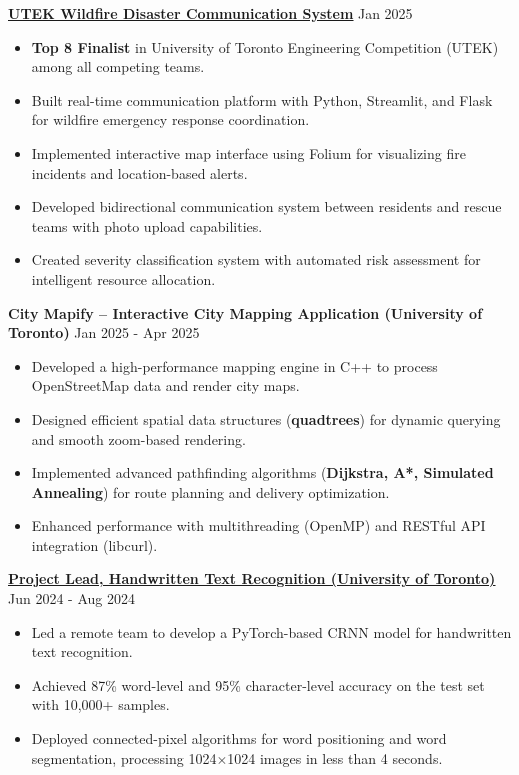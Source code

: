 \documentclass[letterpaper,10pt]{article}
\begin{document}
\noindent\href{https://github.com/Ken-2511/utek_disaster_communication_system}{\uline{
\textbf{UTEK Wildfire Disaster Communication System}}} \hfill Jan 2025
\begin{itemize}[leftmargin=0.2in]
    \item \textbf{Top 8 Finalist} in University of Toronto Engineering Competition (UTEK) among all competing teams.
    \item Built real-time communication platform with Python, Streamlit, and Flask for wildfire emergency response coordination.
    \item Implemented interactive map interface using Folium for visualizing fire incidents and location-based alerts.
    \item Developed bidirectional communication system between residents and rescue teams with photo upload capabilities.
    \item Created severity classification system with automated risk assessment for intelligent resource allocation.
\end{itemize}

\vspace{0.2cm}
\noindent\textbf{City Mapify – Interactive City Mapping Application (University of Toronto)} \hfill Jan 2025 - Apr 2025
\begin{itemize}[leftmargin=0.2in]
    \item Developed a high-performance mapping engine in C++ to process OpenStreetMap data and render city maps.
    \item Designed efficient spatial data structures (\textbf{quadtrees}) for dynamic querying and smooth zoom-based rendering.
    \item Implemented advanced pathfinding algorithms (\textbf{Dijkstra, A*, Simulated Annealing}) for route planning and delivery optimization.
    \item Enhanced performance with multithreading (OpenMP) and RESTful API integration (libcurl).
\end{itemize}

\vspace{0.2cm}
\noindent\href{https://github.com/Ken-2511/HandwritingRecognition}{\uline{
\textbf{Project Lead, Handwritten Text Recognition (University of Toronto)}}} \hfill Jun 2024 - Aug 2024
\begin{itemize}[leftmargin=0.2in]
    \item Led a remote team to develop a PyTorch-based CRNN model for handwritten text recognition.
    \item Achieved 87\% word-level and 95\% character-level accuracy on the test set with 10,000+ samples.
    \item Deployed connected-pixel algorithms for word positioning and word segmentation, processing 1024$\times$1024 images in less than 4 seconds.
\end{itemize}
\end{document}
